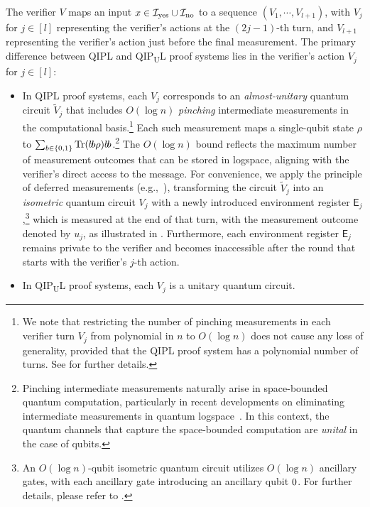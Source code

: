 \documentclass[10pt,a4paper]{article}
\numberwithin{equation}{section}
\numberwithin{figure}{section}
\newcommand{\QIPL}{\textnormal{\textsf{QIPL}}\xspace}
\newcommand{\QIPUL}{\texorpdfstring{\textnormal{\textsf{QIP}\textsubscript{\textnormal{U}}\textsf{L}}}\xspace}
\let\ket\relax\DeclarePairedDelimiter\ket{\lvert}{\rangle}
\let\bra\relax\DeclarePairedDelimiter\bra{\langle}{\rvert}
\newcommand{\ketbra}[2]{\ensuremath{\ket{#1}\!\bra{#2}}}
\newcommand{\Tr}{\mathrm{Tr}}
\newcommand{\yes}{{\rm yes}}
\newcommand{\no}{{\rm no}}
\newcommand{\binset}{\{0,1\}}
\newcommand{\calI}{\mathcal{I}}
\newcommand{\sfE}{\mathsf{E}}
\begin{document}
The verifier $V$ maps an input $x\in \calI_{\yes} \cup \calI_{\no}$ to a sequence $(V_1,\cdots,V_{l+1})$, with $V_j$ for $j \in [l]$ representing the verifier's actions at the $(2j-1)$-th turn, and $V_{l+1}$ representing the verifier's action just before the final measurement. The primary difference between \QIPL{} and \QIPUL{} proof systems lies in the verifier's action $V_j$ for $j\in[l]$: 
\begin{itemize}[itemsep=0.33em, topsep=0.33em, parsep=0.33em]
    \item In \QIPL{} proof systems, each $V_j$ corresponds to an \textit{almost-unitary} quantum circuit $\widetilde{V}_j$ that includes $O(\log n)$ \textit{pinching} intermediate measurements in the computational basis.\footnote{We note that restricting the number of pinching measurements in each verifier turn $V_j$ from polynomial in $n$ to $O(\log{n})$ does not cause any loss of generality, provided that the \QIPL{} proof system has a polynomial number of turns. See  for further details.}
    Each such measurement maps a single-qubit state $\rho$ to $\sum_{b\in\binset} \Tr(\ketbra{b}{b} \rho)\ketbra{b}{b}$.\footnote{Pinching intermediate measurements naturally arise in space-bounded quantum computation, particularly in recent developments on eliminating intermediate measurements in quantum logspace~\cite{GRZ21,GR22}. In this context, the quantum channels that capture the space-bounded computation are \textit{unital} in the case of qubits. }
    The $O(\log{n})$ bound reflects the maximum number of measurement outcomes that can be stored in logspace, aligning with the verifier's direct access to the message. 
    For convenience, we apply the principle of deferred measurements (e.g.,~\cite[Section 4.4]{NC10}), transforming the circuit $\widetilde{V}_j$ into an \textit{isometric} quantum circuit $V_j$ with a newly introduced environment register $\sfE_j$,\footnote{An $O(\log{n})$-qubit isometric quantum circuit utilizes $O(\log n)$ ancillary gates, with each ancillary gate introducing an ancillary qubit $\ket{0}$. For further details, please refer to . } which is measured at the end of that turn, with the measurement outcome denoted by $u_j$, as illustrated in .
    Furthermore, each environment register $\sfE_j$ remains private to the verifier and becomes inaccessible after the round that starts with the verifier's $j$-th action. 
    \item In \QIPUL{} proof systems, each $V_j$ is a unitary quantum circuit. 
\end{itemize}
\end{document}
